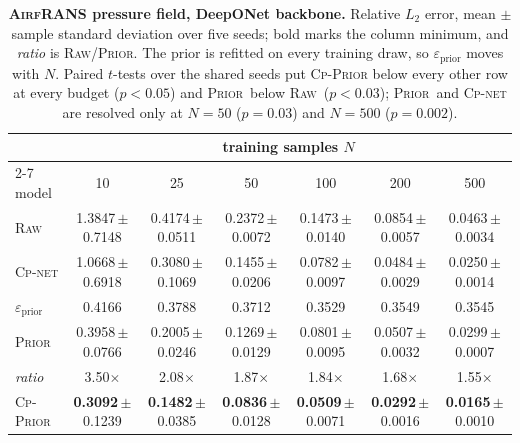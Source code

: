 \documentclass{article}
\newcommand{\armraw}{\textsc{Raw}}
\newcommand{\armprior}{\textsc{Prior}}
\begin{document}
\begin{table}[t]\centering
\caption{\textbf{\textsc{AirfRANS} pressure field, DeepONet backbone.} Relative $L_2$
error, mean $\pm$ sample standard deviation over five seeds; bold marks the column
minimum, and \emph{ratio} is \armraw/\armprior. The prior is refitted on every training
draw, so $\varepsilon_{\mathrm{prior}}$ moves with $N$. Paired $t$-tests over the shared
seeds put \textsc{Cp-Prior} below every other row at every budget ($p<0.05$) and
\armprior\ below \armraw\ ($p<0.03$); \armprior\ and \textsc{Cp-net} are resolved only at
$N{=}50$ ($p=0.03$) and $N{=}500$ ($p=0.002$).}
\label{tab:airfrans}
    \scriptsize
    \setlength{\tabcolsep}{5pt}
    \renewcommand{\arraystretch}{0.7}
\begin{tabular}{l cccccc}
\toprule
& \multicolumn{6}{c}{training samples $N$} \\\cmidrule(l){2-7}
model & 10 & 25 & 50 & 100 & 200 & 500 \\
\midrule
\armraw & 1.3847\,{\scriptsize$\pm$0.7148} & 0.4174\,{\scriptsize$\pm$0.0511} & 0.2372\,{\scriptsize$\pm$0.0072} & 0.1473\,{\scriptsize$\pm$0.0140} & 0.0854\,{\scriptsize$\pm$0.0057} & 0.0463\,{\scriptsize$\pm$0.0034} \\
\textsc{Cp-net} & 1.0668\,{\scriptsize$\pm$0.6918} & 0.3080\,{\scriptsize$\pm$0.1069} & 0.1455\,{\scriptsize$\pm$0.0206} & 0.0782\,{\scriptsize$\pm$0.0097} & 0.0484\,{\scriptsize$\pm$0.0029} & 0.0250\,{\scriptsize$\pm$0.0014} \\
\midrule
$\varepsilon_{\mathrm{prior}}$ & 0.4166 & 0.3788 & 0.3712 & 0.3529 & 0.3549 & 0.3545 \\
\armprior & 0.3958\,{\scriptsize$\pm$0.0766} & 0.2005\,{\scriptsize$\pm$0.0246} & 0.1269\,{\scriptsize$\pm$0.0129} & 0.0801\,{\scriptsize$\pm$0.0095} & 0.0507\,{\scriptsize$\pm$0.0032} & 0.0299\,{\scriptsize$\pm$0.0007} \\
\emph{ratio} & 3.50$\times$ & 2.08$\times$ & 1.87$\times$ & 1.84$\times$ & 1.68$\times$ & 1.55$\times$ \\
\midrule
\textsc{Cp-Prior} & \textbf{0.3092}\,{\scriptsize$\pm$0.1239} & \textbf{0.1482}\,{\scriptsize$\pm$0.0385} & \textbf{0.0836}\,{\scriptsize$\pm$0.0128} & \textbf{0.0509}\,{\scriptsize$\pm$0.0071} & \textbf{0.0292}\,{\scriptsize$\pm$0.0016} & \textbf{0.0165}\,{\scriptsize$\pm$0.0010} \\
\bottomrule
\end{tabular}
            \vspace{-5mm}
\end{table}
\end{document}
